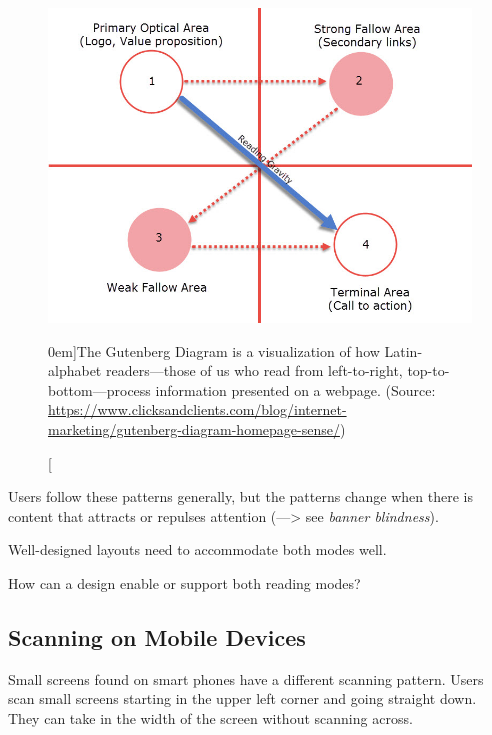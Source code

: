 \begin{figure}%
  \includegraphics[width=1.0\textwidth]{../figures/gutenberg-diagram.jpg}
  \caption[][0em]{The Gutenberg Diagram is a visualization of how Latin-alphabet readers---those of us who read from left-to-right, top-to-bottom---process information presented on a webpage. (Source: \url{https://www.clicksandclients.com/blog/internet-marketing/gutenberg-diagram-homepage-sense/})}
  \label{fig:gutenberg-diagram}
\end{figure}

Users follow these patterns generally, but the patterns change when there is content that attracts or repulses attention (---> see \emph{banner blindness}).

Well-designed layouts need to accommodate both modes well. 

\begin{tcolorbox}[
	width=\textwidth,
	title={\textbf{Question}},
	outer arc=0mm,
	arc=0mm,
	boxrule=1pt,
	]    
How can a design enable or support both reading modes?
\end{tcolorbox} 


\subsection{Scanning on Mobile Devices} %
\label{ssub:scanning_on_mobile_devices}

Small screens found on smart phones have a different scanning pattern. Users scan small screens starting in the upper left corner and going straight down. They can take in the width of the screen without scanning across.

